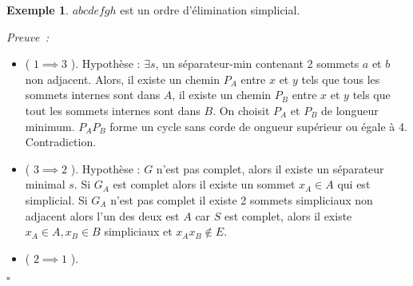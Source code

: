 \documentclass{book}
\theoremstyle{definition}
\newtheorem{example}{Exemple}
\numberwithin{lemma}{subsection}
\numberwithin{theorem}{subsection}
\numberwithin{definition}{subsection}
\numberwithin{proposition}{subsection}
\numberwithin{corollary}{subsection}
\numberwithin{property}{subsection}
\numberwithin{example}{subsection}
\numberwithin{heuristique}{subsection}
\numberwithin{scenario}{subsection}
\newenvironment{proofi} {\noindent\emph{Preuve~:}} {\hfill $\square$\vspace{0.2cm}}
\begin{document}
\begin{example}
\newline
$abcdefgh$ est un ordre d'élimination simplicial.
\end{example}

\begin{proofi}
\begin{itemize}
    \item ( $1 \implies 3$ ). Hypothèse : $\exists s$, un séparateur-min contenant 2 sommets $a$ et $b$ non adjacent. %
    Alors, il existe un chemin $P_A$ entre $x$ et $y$ tels que tous les sommets internes sont dans $A$, il existe un chemin $P_B$ entre $x$ et $y$ tels que tout les sommets internes sont dans $B$.
    On choisit $P_A$ et $P_B$ de longueur minimum. $P_AP_B$ forme un cycle sans corde de ongueur supérieur ou égale à 4. Contradiction.
    \item ( $3 \implies 2$ ). Hypothèse : $G$ n'est pas complet, alors il existe un séparateur minimal $s$. Si $G_A$ est complet alors il existe un sommet $x_A \in A$ qui est simplicial. Si $G_A$ n'est pas complet il existe 2 sommets simpliciaux non adjacent alors l'un des deux est $A$ car $S$ est complet, alors il existe $x_A \in A, x_B \in B$ simpliciaux et $x_Ax_B \notin E$.
    \item ( $2 \implies 1$ ).
\end{itemize}
\end{proofi}
\end{document}

